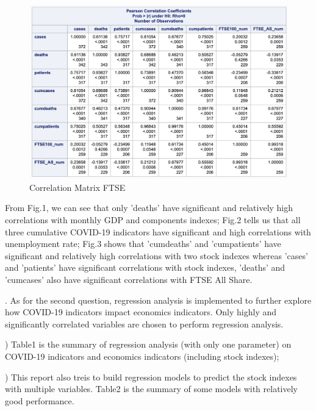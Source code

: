 \documentclass[12pt, a4paper]{report}
\begin{document}
\begin{figure}[H]
\centering
\includegraphics[width=15cm]{corr_FTSE.jpg}
\caption{Correlation Matrix FTSE}
\label{Fig2. Corrlation Matrix 2}
\end{figure}

\noindent
From Fig.1, we can see that only 'deaths' have significant and relatively high correlations with monthly GDP and 
components indexes; Fig.2 tells us that all three cumulative COVID-19 indicators have significant and high 
correlations with unemployment rate; Fig.3 shows that 'cumdeaths' and 'cumpatients' have significant and relatively
high correlations with two stock indexes whereas 'cases' and 'patients' have significant correlations with 
stock indexes, 'deaths' and 'cumcases' also have significant correlations with FTSE All Share.\par
\hspace*{\fill}

. As for the second question, regression analysis is implemented to further explore how COVID-19 indicators impact 
economics indicators. Only highly and significantly correlated variables are chosen to perform regression analysis.\par
{}) Table1 is the summary of regression analysis (with only one parameter) on COVID-19 indicators and economics indicators (including
stock indexes);\par
{}) This report also treis to build regression models to predict the stock indexes with multiple variables. 
Table2 is the summary of some models with relatively good performance. 
\end{document}
